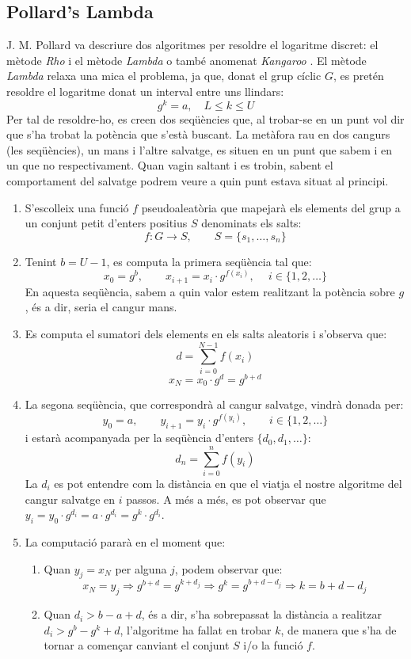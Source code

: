 \documentclass{article}
\begin{document}
\subsection{Pollard's Lambda}
J. M. Pollard \cite{pollard} va descriure dos algoritmes per resoldre el logaritme discret: el mètode \textit{Rho} i el mètode \textit{Lambda} o també anomenat \textit{Kangaroo} \cite{kangaroo}. El mètode \textit{Lambda } relaxa una mica el problema, ja que, donat el grup cíclic $G$, es pretén resoldre el logaritme donat un interval entre uns llindars:
\[g^k = a, \quad L \le k \le U\]
Per tal de resoldre-ho, es creen dos seqüències que, al trobar-se en un punt vol dir que s'ha trobat la potència que s'està buscant. La metàfora rau en dos cangurs (les seqüències), un mans i l'altre salvatge, es situen en un punt que sabem i en un que no respectivament. Quan vagin saltant i es trobin, sabent el comportament del salvatge podrem veure a quin punt estava situat al principi.
\begin{enumerate}
	\item S'escolleix una funció $f$ pseudoaleatòria que mapejarà els elements del grup a un conjunt petit d'enters positius $S$ denominats els salts:
	\[f : G \rightarrow S, \qquad S = \{s_1, \dots, s_n\}\]
	\item Tenint $b = U - 1$, es computa la primera seqüència tal que:
	\[x_0 = g^b, \qquad x_{i+1} = x_i \cdot g^{f(x_i)}, \quad \ i \in \{1, 2, \dots\}\]
	En aquesta seqüència, sabem a quin valor estem realitzant la potència sobre $g$, és a dir, seria el cangur mans.
	\item Es computa el sumatori dels elements en els salts aleatoris i s'observa que:
	\[d = \sum_{i=0}^{N - 1} f(x_i)\]
	\[x_N = x_0 \cdot g^d = g^{b + d}\]
	\item La segona seqüència, que correspondrà al cangur salvatge, vindrà donada per:
	\[y_0 = a, \qquad y_{i+1} = y_i \cdot g^{f(y_i)}, \qquad i \in \{1, 2, \dots\}\]
	i estarà acompanyada per la seqüència d'enters $\{d_0, d_1, \dots \}$:
	\[d_n = \sum_{i=0}^{n}f(y_i)\]
	La $d_i$ es pot entendre com la distància en que el viatja el nostre algoritme del cangur salvatge en $i$ passos. A més a més, es pot observar que $y_i = y_0 \cdot g^{d_i} = a \cdot g^{d_i} = g^{k} \cdot g^{d_i}$.
	\item La computació pararà en el moment que:
	\begin{enumerate}[label=(\Alph*)]
		\item Quan $y_j = x_N$ per alguna $j$, podem observar que:
		\[x_N = y_j \Longrightarrow g^{b + d} = g^{k + d_j} \Longrightarrow g^k = g^{b + d - d_j} \Longrightarrow k = b + d - d_j\]
		\item Quan $d_i > b - a + d $, és a dir, s'ha sobrepassat la distància a realitzar $d_i > g^b - g^k + d$, l'algoritme ha fallat en trobar $k$, de manera que s'ha de tornar a començar canviant el conjunt $S$ i/o la funció $f$.
	\end{enumerate}
\end{enumerate}
\end{document}
